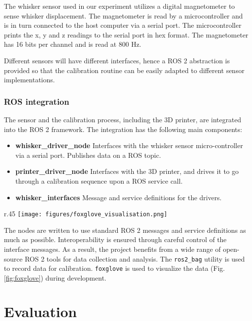 \documentclass[runningheads]{llncs}
\begin{document}
The whisker sensor used in our experiment utilizes a digital magnetometer to sense whisker displacement. The magnetometer is read by a microcontroller and is in turn connected to the host computer via a serial port. The microcontroller prints the x, y and z readings to the serial port in hex format. The magnetometer has 16 bits per channel and is read at 800 Hz.

Different sensors will have different interfaces, hence a ROS 2 abstraction is provided so that the calibration routine can be easily adapted to different sensor implementations.

\subsubsection{ROS integration}

The sensor and the calibration process, including the 3D printer, are integrated into the ROS 2 framework. The integration has the following main components:

\begin{itemize}
    \item \textbf{whisker\_driver\_node} Interfaces with the whisker sensor micro-controller via a serial port. Publishes data on a ROS topic.
    \item \textbf{printer\_driver\_node} Interfaces with the 3D printer, and drives it to go through a calibration sequence upon a ROS service call.
    \item \textbf{whisker\_interfaces} Message and service definitions for the drivers.
\end{itemize}

\begin{wrapfigure}{r}{.45\textwidth}
    \centering
    \texttt{[image: figures/foxglove\_visualisation.png]}
    \caption{Foxglove visualization of whisker sensor system running in ROS 2}
    \label{fig:foxglove}
\end{wrapfigure}

The nodes are written to use standard ROS 2 messages and service definitions as much as possible. Interoperability is ensured through careful control of the interface messages. As a result, the project benefits from a wide range of open-source ROS 2 tools for data collection and analysis. The \verb|ros2_bag| utility is used to record data for calibration. \verb|foxglove| is used to visualize the data (Fig. \ref{fig:foxglove}) during development.

\section{Evaluation}
\end{document}

